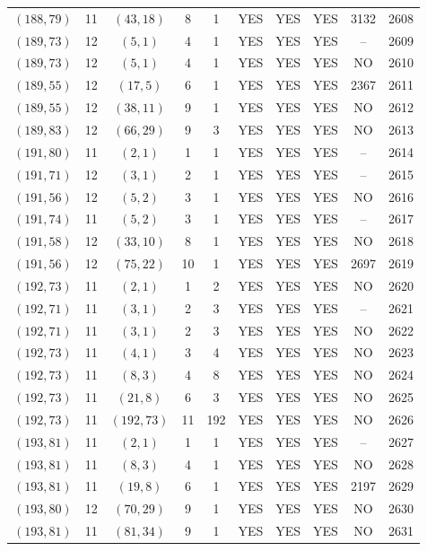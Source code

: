 \begin{longtable}{|c|c|c|c|c|c|c|c|c|c|}
$(188, 79)$ & 11 & $(43, 18)$ & 8 & 1 & YES & YES & YES & 3132 & 2608\\
$(189, 73)$ & 12 & $(5, 1)$ & 4 & 1 & YES & YES & YES & -- & 2609\\
$(189, 73)$ & 12 & $(5, 1)$ & 4 & 1 & YES & YES & YES & NO & 2610\\
$(189, 55)$ & 12 & $(17, 5)$ & 6 & 1 & YES & YES & YES & 2367 & 2611\\
$(189, 55)$ & 12 & $(38, 11)$ & 9 & 1 & YES & YES & YES & NO & 2612\\
$(189, 83)$ & 12 & $(66, 29)$ & 9 & 3 & YES & YES & YES & NO & 2613\\
$(191, 80)$ & 11 & $(2, 1)$ & 1 & 1 & YES & YES & YES & -- & 2614\\
$(191, 71)$ & 12 & $(3, 1)$ & 2 & 1 & YES & YES & YES & -- & 2615\\
$(191, 56)$ & 12 & $(5, 2)$ & 3 & 1 & YES & YES & YES & NO & 2616\\
$(191, 74)$ & 11 & $(5, 2)$ & 3 & 1 & YES & YES & YES & -- & 2617\\
$(191, 58)$ & 12 & $(33, 10)$ & 8 & 1 & YES & YES & YES & NO & 2618\\
$(191, 56)$ & 12 & $(75, 22)$ & 10 & 1 & YES & YES & YES & 2697 & 2619\\
$(192, 73)$ & 11 & $(2, 1)$ & 1 & 2 & YES & YES & YES & NO & 2620\\
$(192, 71)$ & 11 & $(3, 1)$ & 2 & 3 & YES & YES & YES & -- & 2621\\
$(192, 71)$ & 11 & $(3, 1)$ & 2 & 3 & YES & YES & YES & NO & 2622\\
$(192, 73)$ & 11 & $(4, 1)$ & 3 & 4 & YES & YES & YES & NO & 2623\\
$(192, 73)$ & 11 & $(8, 3)$ & 4 & 8 & YES & YES & YES & NO & 2624\\
$(192, 73)$ & 11 & $(21, 8)$ & 6 & 3 & YES & YES & YES & NO & 2625\\
$(192, 73)$ & 11 & $(192, 73)$ & 11 & 192 & YES & YES & YES & NO & 2626\\
$(193, 81)$ & 11 & $(2, 1)$ & 1 & 1 & YES & YES & YES & -- & 2627\\
$(193, 81)$ & 11 & $(8, 3)$ & 4 & 1 & YES & YES & YES & NO & 2628\\
$(193, 81)$ & 11 & $(19, 8)$ & 6 & 1 & YES & YES & YES & 2197 & 2629\\
$(193, 80)$ & 12 & $(70, 29)$ & 9 & 1 & YES & YES & YES & NO & 2630\\
$(193, 81)$ & 11 & $(81, 34)$ & 9 & 1 & YES & YES & YES & NO & 2631\\

\end{longtable}

